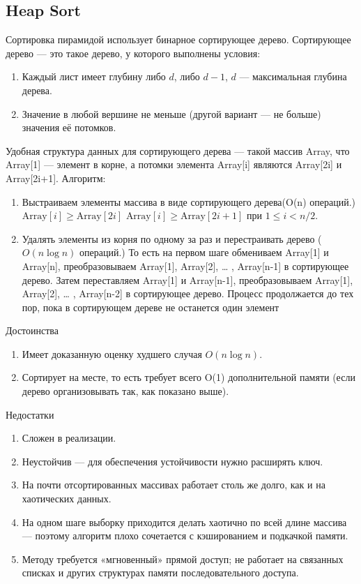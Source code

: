 \documentclass[a4paper]{article}
\begin{document}
\subsection{Heap Sort}
Сортировка пирамидой использует бинарное сортирующее дерево. Сортирующее дерево — это такое дерево, у которого выполнены условия:
\begin{enumerate}
	\item Каждый лист имеет глубину либо $d$, либо $d-1$, $d$ — максимальная глубина дерева.
	\item Значение в любой вершине не меньше (другой вариант — не больше) значения её потомков.
\end{enumerate}
Удобная структура данных для сортирующего дерева — такой массив Array, что Array[1] — элемент в корне, а потомки элемента Array[i] являются Array[2i] и Array[2i+1].
Алгоритм:
\begin{enumerate}
	\item Выстраиваем элементы массива в виде сортирующего дерева(O(n) операций.)
		$\text{Array}[i]\geq \text{Array}[2i]$
		$\text{Array}[i]\geq \text{Array}[2i+1]$
		при $1\leq i<n/2$.
	\item Удалять элементы из корня по одному за раз и перестраивать дерево ($O(n \log n)$ операций.)
	То есть на первом шаге обмениваем Array[1] и Array[n], преобразовываем Array[1], Array[2], … , Array[n-1] в сортирующее дерево. Затем переставляем Array[1] и Array[n-1], преобразовываем Array[1], Array[2], … , Array[n-2] в сортирующее дерево. Процесс продолжается до тех пор, пока в сортирующем дереве не останется один элемент
\end{enumerate}
Достоинства
\begin{enumerate}
	\item Имеет доказанную оценку худшего случая $O(n\log n)$.
	\item Сортирует на месте, то есть требует всего O(1) дополнительной памяти (если дерево организовывать так, как показано выше).
\end{enumerate}

Недостатки
\begin{enumerate}
	\item Сложен в реализации.
	\item Неустойчив — для обеспечения устойчивости нужно расширять ключ.
	\item На почти отсортированных массивах работает столь же долго, как и на хаотических данных.
	\item На одном шаге выборку приходится делать хаотично по всей длине массива — поэтому алгоритм плохо сочетается с кэшированием и подкачкой памяти.
	\item Методу требуется «мгновенный» прямой доступ; не работает на связанных списках и других структурах памяти последовательного доступа.
\end{enumerate}
\end{document}
